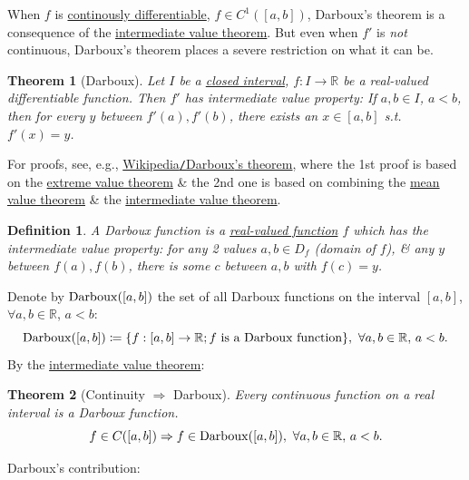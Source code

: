 \documentclass{article}
\newtheorem{definition}{Definition}
\newtheorem{theorem}{Theorem}
\begin{document}
When $f$ is \href{https://en.wikipedia.org/wiki/Continuously_differentiable}{continously differentiable}, $f\in C^1([a,b])$, {\sc Darboux}'s theorem is a consequence of the \href{https://en.wikipedia.org/wiki/Intermediate_value_theorem}{intermediate value theorem}. But even when $f'$ is {\it not} continuous, {\sc Darboux}'s theorem places a severe restriction on what it can be.

\begin{theorem}[Darboux]
	Let $I$ be a \href{https://en.wikipedia.org/wiki/Closed_interval}{closed interval}, $f:I\to\mathbb{R}$ be a real-valued differentiable function. Then $f'$ has {\rm intermediate value property}: If $a,b\in I$, $a < b$, then for every $y$ between $f'(a),f'(b)$, there exists an $x\in[a,b]$ s.t. $f'(x) = y$.
\end{theorem}
For proofs, see, e.g., \href{https://en.wikipedia.org/wiki/Darboux%27s_theorem_(analysis)}{Wikipedia{\tt/}{\sc Darboux}'s theorem}, where the 1st proof is based on the \href{https://en.wikipedia.org/wiki/Extreme_value_theorem}{extreme value theorem} \& the 2nd one is based on combining the \href{https://en.wikipedia.org/wiki/Mean_value_theorem}{mean value theorem} \& the \href{https://en.wikipedia.org/wiki/Intermediate_value_theorem}{intermediate value theorem}.

\begin{definition}
	A {\rm Darboux function} is a \href{https://en.wikipedia.org/wiki/Real-valued_function}{real-valued function} $f$ which has the intermediate value property: for any 2 values $a,b\in D_f$ (domain of $f$), \& any $y$ between $f(a),f(b)$, there is some $c$ between $a,b$ with $f(c) = y$.
\end{definition}
Denote by ${\rm Darboux}([a,b])$ the set of all Darboux functions on the interval $[a,b]$, $\forall a,b\in\mathbb{R}$, $a < b$:
\begin{equation*}
	{\rm Darboux}([a,b])\coloneqq\{f:[a,b]\to\mathbb{R};f\mbox{ is a Darboux function}\},\ \forall a,b\in\mathbb{R},\, a < b.
\end{equation*}
By the \href{https://en.wikipedia.org/wiki/Intermediate_value_theorem}{intermediate value theorem}:

\begin{theorem}[Continuity $\Rightarrow$ Darboux]
	Every continuous function on a real interval is a Darboux function.
	\begin{equation*}
		f\in C([a,b])\Rightarrow f\in{\rm Darboux}([a,b]),\ \forall a,b\in\mathbb{R},\, a < b.
	\end{equation*}
\end{theorem}
{\sc Darboux}'s contribution:
\end{document}
